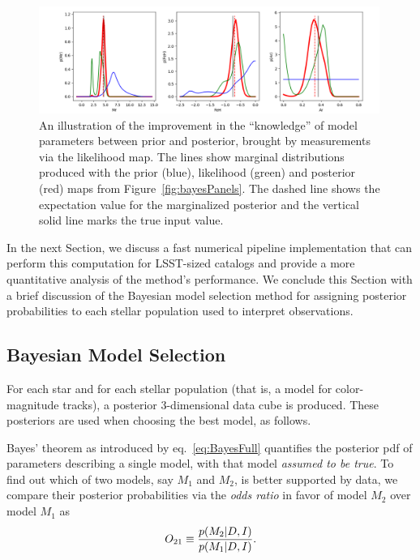 \begin{figure}[t!]
\includegraphics[width=0.99\textwidth,angle=0]{figures/margPosteriors3D_ex1.png}
\caption{An illustration of the improvement in the ``knowledge'' of model parameters between prior and posterior,
brought by measurements via the likelihood map. The lines show marginal distributions produced with the
prior (blue), likelihood (green) and posterior (red) maps from Figure~\ref{fig:bayesPanels}. The dashed line shows the
expectation value for the marginalized posterior and the vertical solid line marks the true input value.}
\label{fig:margPost3D}
\end{figure}



In the next Section, we discuss a fast numerical pipeline implementation that can perform this computation for LSST-sized
catalogs and provide a more quantitative analysis of the method's performance.  We conclude this Section with a brief
discussion of the Bayesian model selection method for assigning posterior probabilities to each stellar population used to interpret
observations. 


\subsection{Bayesian Model Selection \label{sec:ModSel}} 

For each star and for each stellar population (that is, a model for color-magnitude tracks), a posterior
3-dimensional data cube is produced.  These posteriors are used when choosing the best model, as follows.

Bayes' theorem as introduced by eq.~\ref{eq:BayesFull} quantifies the posterior
pdf of parameters describing a single model, with that model {\it assumed to be true}.
To find out which of two models, say $M_1$ and $M_2$, is better supported by data, we
compare their posterior probabilities via the {\it odds ratio} in favor of model $M_2$ over
model $M_1$ as 
\begin{equation}
                  O_{21} \equiv { p(M_2|D,I) \over p(M_1|D,I) }.
\end{equation}     

